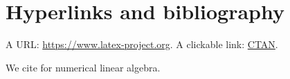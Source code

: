 \documentclass[11pt,a4paper]{article}
\begin{document}
\section{Hyperlinks and bibliography}

A URL: \url{https://www.latex-project.org}. A clickable link: \href{https://ctan.org}{CTAN}.

We cite \parencite{trefethen1997} for numerical linear algebra.

\printbibliography

\end{document}
